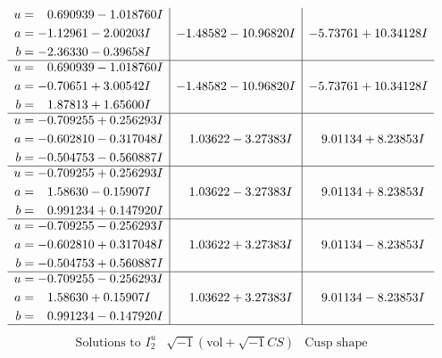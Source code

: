 \documentclass[1p]{elsarticle_modified}
\theoremstyle{definition}
\newcommand{\I}{\sqrt{-1}}
\begin{document}
$$\begin{array}{c|c|c}
\begin{aligned}
u &= \phantom{-}0.690939 - 1.018760 I \\
a &= -1.12961 - 2.00203 I \\
b &= -2.36330 - 0.39658 I\end{aligned}
 & -1.48582 - 10.96820 I & -5.73761 + 10.34128 I \\ \hline\begin{aligned}
u &= \phantom{-}0.690939 - 1.018760 I \\
a &= -0.70651 + 3.00542 I \\
b &= \phantom{-}1.87813 + 1.65600 I\end{aligned}
 & -1.48582 - 10.96820 I & -5.73761 + 10.34128 I \\ \hline\begin{aligned}
u &= -0.709255 + 0.256293 I \\
a &= -0.602810 - 0.317048 I \\
b &= -0.504753 - 0.560887 I\end{aligned}
 & \phantom{-}1.03622 - 3.27383 I & \phantom{-}9.01134 + 8.23853 I \\ \hline\begin{aligned}
u &= -0.709255 + 0.256293 I \\
a &= \phantom{-}1.58630 - 0.15907 I \\
b &= \phantom{-}0.991234 + 0.147920 I\end{aligned}
 & \phantom{-}1.03622 - 3.27383 I & \phantom{-}9.01134 + 8.23853 I \\ \hline\begin{aligned}
u &= -0.709255 - 0.256293 I \\
a &= -0.602810 + 0.317048 I \\
b &= -0.504753 + 0.560887 I\end{aligned}
 & \phantom{-}1.03622 + 3.27383 I & \phantom{-}9.01134 - 8.23853 I \\ \hline\begin{aligned}
u &= -0.709255 - 0.256293 I \\
a &= \phantom{-}1.58630 + 0.15907 I \\
b &= \phantom{-}0.991234 - 0.147920 I\end{aligned}
 & \phantom{-}1.03622 + 3.27383 I & \phantom{-}9.01134 - 8.23853 I\\
 \hline 
 \end{array}$$\newpage$$\begin{array}{c|c|c}  
\text{Solutions to }I^u_{2}& \I (\text{vol} + \sqrt{-1}CS) & \text{Cusp shape}\\
 \hline 
\begin{aligned}

\end{aligned}
\end{array}$$
\end{document}
